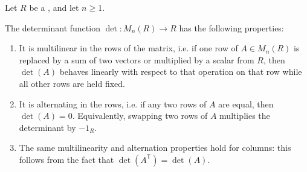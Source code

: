 \begin{proposition} \label{proposition:determinant_is_alternating_multilinear_in_rows_and_columns_over_a_commutative_ring}
    Let $R$ be a , and let $n \geq 1$.

    The determinant function $\det \colon M_n(R) \to R$ has the following properties:
    \begin{enumerate}
        \item It is multilinear in the rows of the matrix, i.e. if one row of $A \in M_n(R)$ is replaced by a sum of two vectors or multiplied by a scalar from $R$, then $\det(A)$ behaves linearly with respect to that operation on that row while all other rows are held fixed.

        \item It is alternating in the rows, i.e. if any two rows of $A$ are equal, then $\det(A) = 0$. Equivalently, swapping two rows of $A$ multiplies the determinant by $-1_R$.

        \item The same multilinearity and alternation properties hold for columns: this follows from the fact that $\det(A^{\mathsf{T}}) = \det(A)$.
    \end{enumerate}
\end{proposition}